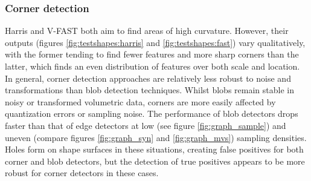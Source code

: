 \subsubsection{Corner detection} Harris and V-FAST both aim to find areas of high curvature. However, their outputs (figures \ref{fig:testshapes:harris} and \ref{fig:testshapes:fast}) vary qualitatively, with the former tending to find fewer features and more sharp corners than the latter, which finds an even distribution of features over both scale and location. In general, corner detection approaches are relatively less robust to noise and transformations than blob detection techniques. Whilst blobs remain stable in noisy or transformed volumetric data, corners are more easily affected by quantization errors or sampling noise. 
The performance of blob detectors drops faster than that of edge detectors at low (see figure \ref{fig:graph_sample}) and uneven (compare figures \ref{fig:graph_syn} and \ref{fig:graph_mvs}) sampling densities. Holes form on shape surfaces in these situations, creating false positives for both corner and blob detectors, but the detection of true positives appears to be more robust for corner detectors in these cases. 


